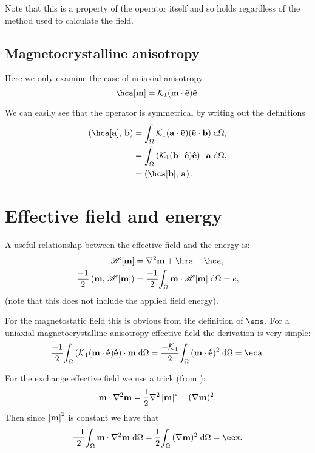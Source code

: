Note that this is a property of the operator itself and so holds regardless of the method used to calculate the field.


\subsection{Magnetocrystalline anisotropy}

Here we only examine the case of uniaxial anisotropy
\begin{equation}
  \hca[\mv] = \kone (\mv \cdot \ev) \ev.
\end{equation}

We can easily see that the operator is symmetrical by writing out the definitions
\begin{equation}
  \begin{aligned}
    \ip{\hca[\av]}{\bv} &= \intd{ \kone (\av \cdot \ev) (\ev \cdot \bv)}, \\
    &= \intd{(\kone(\bv \cdot \ev) \ev) \cdot \av}, \\
    &= \ip{\hca[\bv]}{\av}.
  \end{aligned}
\end{equation}


\section{Effective field and energy}
\label{sec:energy-field-relation}

A useful relationship between the effective field and the energy is:
\begin{equation}
  \begin{aligned}
    \hop[\mv] &=  \lap \mv + \hms + \hca, \\
    \frac{-1}{2} \ip{\mv}{\hop[\mv]} &= \frac{-1}{2} \intd{\mv \cdot
      \hop[\mv]} = \e,
  \end{aligned}
\end{equation}
(note that this does not include the applied field energy).

For the magnetostatic field this is obvious from the definition of $\ems$. 
For a uniaxial magnetocrystalline anisotropy effective field the derivation is very simple:
\begin{equation}
  \frac{-1}{2} \intd{\bigb{\kone (\mv \cdot \ev) \ev} \cdot \mv} =  \frac{-\kone}{2}\intd{(\mv \cdot \ev)^2} = \eca.
\end{equation}

For the exchange effective field we use a trick (from \cite[179]{Aharoni1996}):
\begin{equation}
  \mathbf{m} \cdot \nabla^2 \mathbf{m} = \frac{1}{2} \nabla^2 \left|{\mathbf{m}} \right|^2 - (\nabla \mathbf{m})^2.
\end{equation}
Then since $\left|{\mathbf{m}} \right|^2$ is constant we have that
\begin{equation}
  \frac{-1}{2} \intd{\mv \cdot \lap \mv} = \frac{1}{2} \intd{(\grad \mv)^2} = \eex.
\end{equation}


